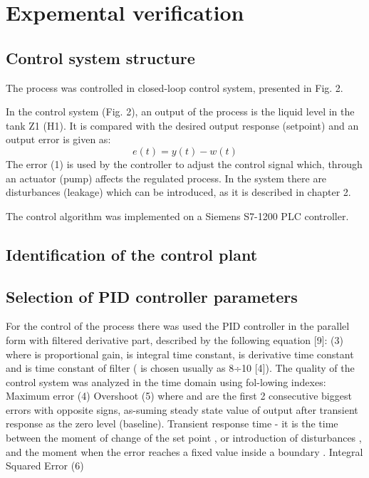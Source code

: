 \documentclass{amcs}
\begin{document}
\section{Expemental verification}

\subsection{Control system structure}
%
The process was controlled in closed-loop control system, presented in Fig. 2.

In the control system (Fig. 2), an output of the process   is the liquid level in the tank Z1 (H1). It is compared with the desired output response (setpoint)   and an output error is given as:
\begin{equation}
e(t)=y(t)-w(t)
\end{equation}
The error (1) is used by the controller to adjust the control signal   which, through an actuator (pump) affects the regulated process. In the system there are disturbances   (leakage) which can be introduced, as it is described in chapter 2.

The control algorithm was implemented on a Siemens S7-1200 PLC controller. 

\subsection{Identification of the control plant}

\subsection{Selection of PID controller parameters}

For the control of the process there was used the PID controller in the parallel form with filtered derivative part, described by the following equation [9]:
(3)
where    is proportional gain,   is integral time constant,   is derivative time constant and   is time constant of filter (  is chosen usually as 8÷10 [4]).
The quality of the control system was analyzed in the time domain using fol-lowing indexes:
Maximum error
(4)
Overshoot
(5)
where   and   are the first 2 consecutive biggest errors with opposite signs, as-suming steady state value of output   after transient response as the zero level (baseline).
Transient response time  - it is the time between the moment of change of the set point  , or introduction of disturbances   , and the moment when the error   reaches a fixed value inside a boundary  .
Integral Squared Error
(6)
%
\end{document}
